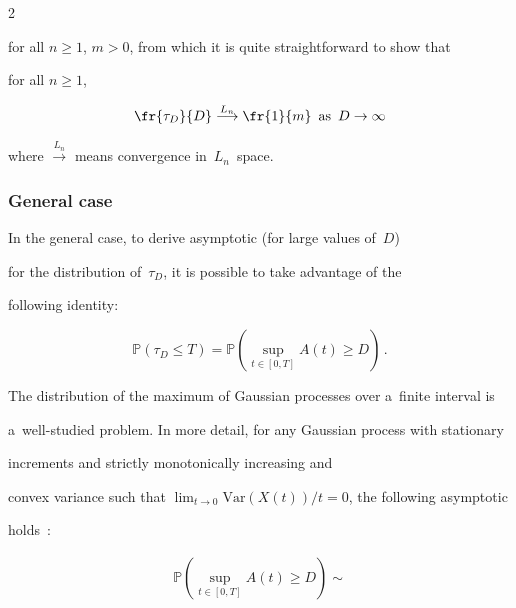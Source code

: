 \begin{multicols}{2}
\begin{equation*}
\end{equation*}

for all $n \ge 1$, $m>0$, from which it is quite straightforward to show that 

for all $n \ge 1$, 

\begin{equation*}

     \fr{\tau_D}{D} \overset{L_n}{\longrightarrow} \fr{1}{m}\enskip 

     \mbox{as} \enskip D \to \infty

\end{equation*}

where $\overset{L_n}{\longrightarrow}$ means convergence in~$L_n$~space.



\subsubsection{General case}



\noindent

In the general case,  to derive asymptotic (for large values of~$D$) 

for the distribution of~$\tau_D$,  it is possible to take advantage of the 

following identity: 

\begin{equation*}

\mathbb{P}\left(\tau_D \le  T\right) = 

\mathbb{P}\left(\sup\limits_{t \in [0,T]}A(t)\ge D\right)\,.

\end{equation*}



The distribution of the maximum of Gaussian processes over a~finite interval is 

a~well-studied  problem. In more detail, for any Gaussian process with stationary 

increments and strictly monotonically increasing and

convex variance such that $\lim\nolimits_{t\to 0} \mathrm{Var}(X(t))/t=0$, the following asymptotic 

holds~\cite{18-luk-1}:

\begin{multline*}

\mathbb{P}\left(\sup\limits_{t \in [0,T]}A(t)\ge D\right) \sim 


\end{multline*}
\end{multicols}
